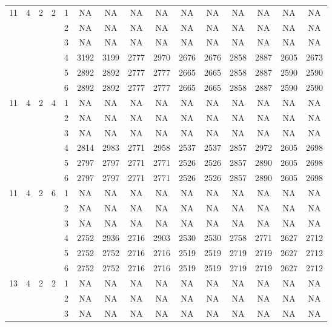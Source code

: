 \begin{longtable}{|c|c|c|c|c|c c|c c|c c|c c|c c|}
\hline
\multirow{6}{*}{11} & \multirow{6}{*}{4} & \multirow{6}{*}{2} & \multirow{6}{*}{2} & 1 & NA & NA & NA & NA & NA & NA & NA & NA & NA & NA \\
 & & & & 2 & NA & NA & NA & NA & NA & NA & NA & NA & NA & NA \\
 & & & & 3 & NA & NA & NA & NA & NA & NA & NA & NA & NA & NA \\
 & & & & 4 & 3192 & 3199 & 2777 & 2970 & 2676 & 2676 & 2858 & 2887 & 2605 & 2673 \\
 & & & & 5 & 2892 & 2892 & 2777 & 2777 & 2665 & 2665 & 2858 & 2887 & 2590 & 2590 \\
 & & & & 6 & 2892 & 2892 & 2777 & 2777 & 2665 & 2665 & 2858 & 2887 & 2590 & 2590 \\
\hline
\multirow{6}{*}{11} & \multirow{6}{*}{4} & \multirow{6}{*}{2} & \multirow{6}{*}{4} & 1 & NA & NA & NA & NA & NA & NA & NA & NA & NA & NA \\
 & & & & 2 & NA & NA & NA & NA & NA & NA & NA & NA & NA & NA \\
 & & & & 3 & NA & NA & NA & NA & NA & NA & NA & NA & NA & NA \\
 & & & & 4 & 2814 & 2983 & 2771 & 2958 & 2537 & 2537 & 2857 & 2972 & 2605 & 2698 \\
 & & & & 5 & 2797 & 2797 & 2771 & 2771 & 2526 & 2526 & 2857 & 2890 & 2605 & 2698 \\
 & & & & 6 & 2797 & 2797 & 2771 & 2771 & 2526 & 2526 & 2857 & 2890 & 2605 & 2698 \\
\hline
\multirow{6}{*}{11} & \multirow{6}{*}{4} & \multirow{6}{*}{2} & \multirow{6}{*}{6} & 1 & NA & NA & NA & NA & NA & NA & NA & NA & NA & NA \\
 & & & & 2 & NA & NA & NA & NA & NA & NA & NA & NA & NA & NA \\
 & & & & 3 & NA & NA & NA & NA & NA & NA & NA & NA & NA & NA \\
 & & & & 4 & 2752 & 2936 & 2716 & 2903 & 2530 & 2530 & 2758 & 2771 & 2627 & 2712 \\
 & & & & 5 & 2752 & 2752 & 2716 & 2716 & 2519 & 2519 & 2719 & 2719 & 2627 & 2712 \\
 & & & & 6 & 2752 & 2752 & 2716 & 2716 & 2519 & 2519 & 2719 & 2719 & 2627 & 2712 \\
\hline
\multirow{6}{*}{13} & \multirow{6}{*}{4} & \multirow{6}{*}{2} & \multirow{6}{*}{2} & 1 & NA & NA & NA & NA & NA & NA & NA & NA & NA & NA \\
 & & & & 2 & NA & NA & NA & NA & NA & NA & NA & NA & NA & NA \\
 & & & & 3 & NA & NA & NA & NA & NA & NA & NA & NA & NA & NA \\

\end{longtable}
